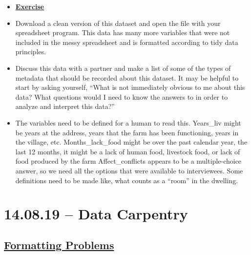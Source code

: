 \documentclass[12pt]{article}
\begin{document}
\color{gray}
\begin{itemize}
\renewcommand{\labelitemi}{$\nobullet$}
\item \textbf{\underline{Exercise}}
    \item Download a clean version of this dataset and open the file with your spreadsheet program. This data has many more variables that were not included in the messy spreadsheet and is formatted according to tidy data principles.
    \item Discuss this data with a partner and make a list of some of the types of metadata that should be recorded about this dataset. It may be helpful to start by asking yourself, “What is not immediately obvious to me about this data? What questions would I need to know the answers to in order to analyze and interpret this data?”
\end{itemize}

\color{black}
\begin{itemize}
\renewcommand{\labelitemi}{$\nobullet$}
    \item The variables need to be defined for a human to read this. Years\_liv might be years at the address, years that the farm has been functioning, years in the village, etc. Months\_lack\_food might be over the past calendar year, the last 12 months, it might be a lack of human food, livestock food, or lack of food produced by the farm
    \vspace{0.5em}
    \newline Affect\_conflicts appears to be a multiple-choice answer, so we need all the options that were available to interviewees.
    \vspace{0.5em}
    \newline Some definitions need to be made like, what counts as a “room” in the dwelling.
\end{itemize}

\newpage\section{14.08.19 – Data Carpentry}

\subsection{\textbf{\href{https://datacarpentry.org/spreadsheets-socialsci/02-common-mistakes/index.html}{Formatting Problems}}}
\end{document}
